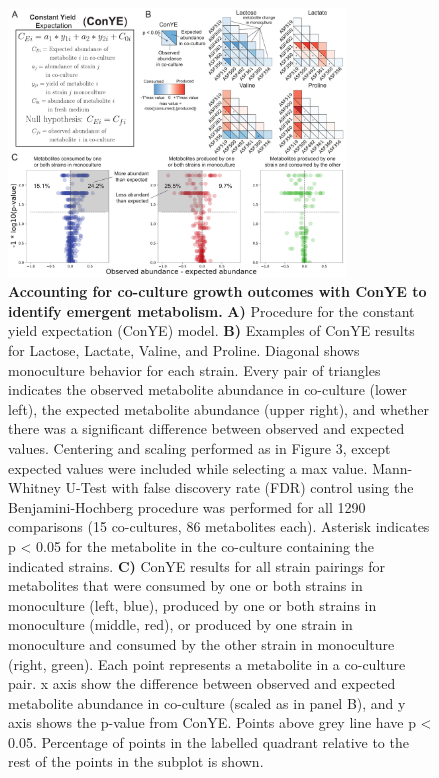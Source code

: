 \documentclass[11pt,twocolumn,notitlepage,openany,twoside]{book}
\begin{document}
\begin{figure}
\centering
\includegraphics[width=0.8\textwidth]{ch2_fig4}
\caption[Accounting for co-culture growth outcomes with ConYE to identify emergent metabolism.]{\textbf{Accounting for co-culture growth outcomes with ConYE to identify emergent metabolism.} \textbf{A)} Procedure for the constant yield expectation (ConYE) model. \textbf{B)} Examples of ConYE results for Lactose, Lactate, Valine, and Proline. Diagonal shows monoculture behavior for each strain. Every pair of triangles indicates the observed metabolite abundance in co-culture (lower left), the expected metabolite abundance (upper right), and whether there was a significant difference between observed and expected values. Centering and scaling performed as in Figure 3, except expected values were included while selecting a max value. Mann-Whitney U-Test with false discovery rate (FDR) control using the Benjamini-Hochberg procedure was performed for all 1290 comparisons (15 co-cultures, 86 metabolites each). Asterisk indicates p < 0.05 for the metabolite in the co-culture containing the indicated strains. \textbf{C)} ConYE results for all strain pairings for metabolites that were consumed by one or both strains in monoculture (left, blue), produced by one or both strains in monoculture (middle, red), or produced by one strain in monoculture and consumed by the other strain in monoculture (right, green). Each point represents a metabolite in a co-culture pair. x axis show the difference between observed and expected metabolite abundance in co-culture (scaled as in panel B), and y axis shows the p-value from ConYE. Points above grey line have p < 0.05. Percentage of points in the labelled quadrant relative to the rest of the points in the subplot is shown.}
\end{figure}
\end{document}
